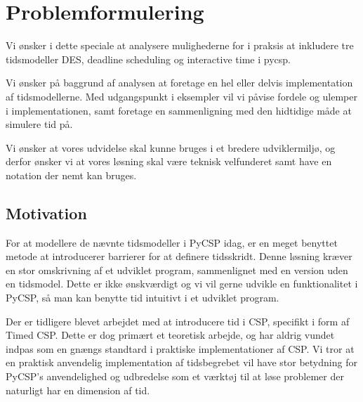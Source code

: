 \section*{Problemformulering}

Vi ønsker i dette speciale at analysere mulighederne for i praksis at inkludere tre tidsmodeller DES, deadline scheduling og interactive time i pycsp.

Vi ønsker på baggrund af analysen at foretage en hel eller delvis implementation af tidsmodellerne. Med udgangspunkt i eksempler vil vi påvise fordele og ulemper i implementationen, samt foretage en sammenligning med den hidtidige måde at simulere tid på.

Vi ønsker at vores udvidelse skal kunne bruges i et bredere udviklermiljø, og derfor ønsker vi at vores løsning skal være teknisk velfunderet samt have en notation der nemt kan bruges.

\subsection*{Motivation}
For at modellere de nævnte tidsmodeller i PyCSP idag, er en meget benyttet metode at introducerer barrierer for at definere tidsskridt. Denne løsning kræver en stor omskrivning af et udviklet program, sammenlignet med en version uden en tidsmodel. Dette er ikke ønskværdigt og vi vil gerne udvikle en funktionalitet i PyCSP, så man kan benytte tid intuitivt i et udviklet program.

Der er tidligere blevet arbejdet med at introducere tid i CSP, specifikt i form af Timed CSP. Dette er dog primært et teoretisk arbejde, og har aldrig vundet indpas som en gnængs standtard i praktiske implementationer af CSP. 
Vi tror at en praktisk anvendelig implementation af tidsbegrebet vil have stor betydning for PyCSP's anvendelighed og udbredelse som et værktøj til at løse problemer der naturligt har en dimension af tid. 



